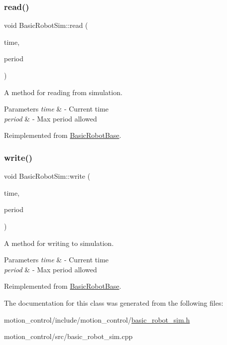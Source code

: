\subsubsection{\texorpdfstring{read()}{read()}}
{\footnotesize\ttfamily void Basic\+Robot\+Sim\+::read (\begin{DoxyParamCaption}\item[{const ros\+::\+Time \&}]{time,  }\item[{const ros\+::\+Duration \&}]{period }\end{DoxyParamCaption})\hspace{0.3cm}{\ttfamily [virtual]}}



A method for reading from simulation. 


\begin{DoxyParams}{Parameters}
{\em time} & -\/ Current time \\
\hline
{\em period} & -\/ Max period allowed \\
\hline
\end{DoxyParams}


Reimplemented from \hyperlink{classBasicRobotBase_a64bb2c7bed72e98fb62a37d6beb4fe5a}{Basic\+Robot\+Base}.

\mbox{\label{classBasicRobotSim_a0efb3d3e006cd5c233e2e273d89e06f6}} 
\subsubsection{\texorpdfstring{write()}{write()}}
{\footnotesize\ttfamily void Basic\+Robot\+Sim\+::write (\begin{DoxyParamCaption}\item[{const ros\+::\+Time \&}]{time,  }\item[{const ros\+::\+Duration \&}]{period }\end{DoxyParamCaption})\hspace{0.3cm}{\ttfamily [virtual]}}



A method for writing to simulation. 


\begin{DoxyParams}{Parameters}
{\em time} & -\/ Current time \\
\hline
{\em period} & -\/ Max period allowed \\
\hline
\end{DoxyParams}


Reimplemented from \hyperlink{classBasicRobotBase_afbc6ef4347fc05e053391692a9e1bc24}{Basic\+Robot\+Base}.



The documentation for this class was generated from the following files\+:\begin{DoxyCompactItemize}
\item 
motion\+\_\+control/include/motion\+\_\+control/\hyperlink{basic__robot__sim_8h}{basic\+\_\+robot\+\_\+sim.\+h}\item 
motion\+\_\+control/src/basic\+\_\+robot\+\_\+sim.\+cpp\end{DoxyCompactItemize}
